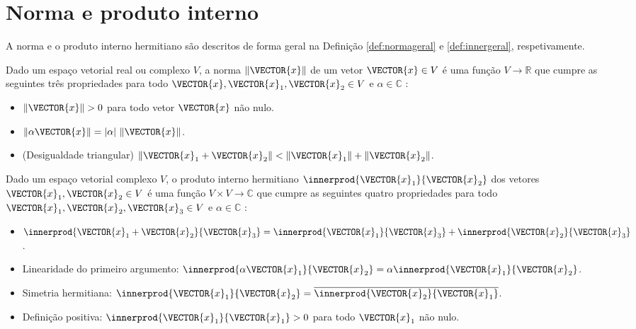 
\newpage
\section{Norma e produto interno}

A norma e o produto interno hermitiano são descritos de forma geral
na Definição \ref{def:normageral} e \ref{def:innergeral}, respetivamente.

\begin{definition}
\label{def:normageral}
Dado um espaço vetorial real ou complexo $V$,
a norma $\|\VECTOR{x}\|$ de um vetor $\VECTOR{x} \in V$ 
é uma função $V \rightarrow  \mathbb{R}$ 
que cumpre as seguintes três propriedades 
para todo $\VECTOR{x},\VECTOR{x}_1,\VECTOR{x}_2 \in V$ e $\alpha \in \mathbb{C}$ 
\cite[pp. 43]{d2019hermitian} \cite[pp. 27]{vetterli2014foundations}:
\begin{itemize}
\item $\|\VECTOR{x}\|> 0$ para todo vetor $\VECTOR{x}$ não nulo.
\item $\|\alpha \VECTOR{x}\|= |\alpha|~\|\VECTOR{x}\|$.
\item (Desigualdade triangular)  $\|\VECTOR{x}_1 + \VECTOR{x}_2\|< \|\VECTOR{x}_1\| + \|\VECTOR{x}_2\|$.
\end{itemize}
\end{definition}

\begin{definition}
\label{def:innergeral}
Dado um espaço vetorial complexo $V$, 
o produto interno hermitiano $\innerprod{\VECTOR{x}_1}{\VECTOR{x}_2} $ dos vetores $\VECTOR{x}_1,\VECTOR{x}_2 \in V$ 
é uma função $V\times V \rightarrow \mathbb{C}$ 
que cumpre as seguintes quatro propriedades para todo 
$\VECTOR{x}_1,\VECTOR{x}_2,\VECTOR{x}_3 \in V$ e $\alpha \in \mathbb{C}$
 \cite[pp. 44]{d2019hermitian} \cite[pp. 242]{damiano2011course}:
\begin{itemize}
\item $\innerprod{\VECTOR{x}_1+\VECTOR{x}_2}{\VECTOR{x}_3} = \innerprod{\VECTOR{x}_1}{\VECTOR{x}_3} + \innerprod{\VECTOR{x}_2}{\VECTOR{x}_3}$.
\item Linearidade do primeiro argumento: $\innerprod{\alpha \VECTOR{x}_1}{\VECTOR{x}_2} =\alpha \innerprod{\VECTOR{x}_1}{\VECTOR{x}_2}$.
\item Simetria hermitiana: $\innerprod{\VECTOR{x}_1}{\VECTOR{x}_2} =\overline{ \innerprod{\VECTOR{x}_2}{\VECTOR{x}_1}}$.
\item Definição positiva: $\innerprod{\VECTOR{x}_1}{\VECTOR{x}_1} > 0 $  para todo $\VECTOR{x}_1$ não nulo.
\end{itemize}
\end{definition}

